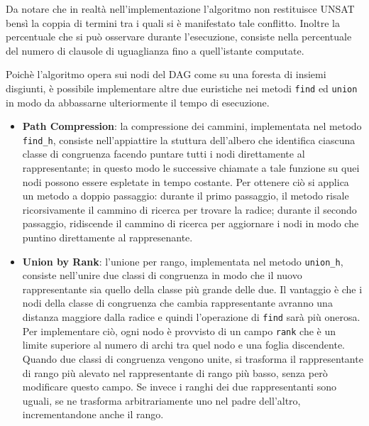 \documentclass[a4paper,11pt]{article}
\begin{document}
Da notare che in realtà nell'implementazione l'algoritmo non restituisce 
UNSAT bensì la coppia di termini tra i quali si è 
manifestato tale conflitto. Inoltre la percentuale che si può osservare 
durante l'esecuzione, consiste nella percentuale del numero di clausole di 
uguaglianza fino a quell'istante computate.\par
Poichè l'algoritmo opera sui nodi del DAG come su una foresta di insiemi 
disgiunti, è possibile implementare altre due euristiche nei metodi 
\texttt{find} ed \texttt{union} in modo da abbassarne ulteriormente 
il tempo di esecuzione.
\begin{itemize}
\item {\bf Path Compression}: la compressione dei cammini, implementata 
nel metodo \texttt{find\_h}, consiste nell'appiattire la stuttura 
dell'albero che identifica ciascuna classe di congruenza facendo puntare
tutti i nodi direttamente al rappresentante; in questo modo le successive 
chiamate a tale funzione su quei nodi possono essere espletate in 
tempo costante. Per ottenere ciò si applica un metodo a doppio 
passaggio: durante il primo passaggio, il metodo risale ricorsivamente 
il cammino di ricerca per trovare la radice; durante il secondo passaggio, 
ridiscende il cammino di ricerca per aggiornare i nodi in modo che 
puntino direttamente al rappresenante.
\item {\bf Union by Rank}: l'unione per rango, implementata nel metodo 
\texttt{union\_h}, consiste nell'unire due classi di congruenza in 
modo che il nuovo rappresentante sia quello della classe più grande 
delle due. Il vantaggio è che i nodi della classe di congruenza che 
cambia rappresentante avranno una distanza maggiore dalla radice e 
quindi l'operazione di \texttt{find} sarà più onerosa. Per implementare 
ciò, ogni nodo è provvisto di un campo \texttt{rank} che è un limite 
superiore al numero di archi tra quel nodo e una foglia discendente.
Quando due classi di congruenza vengono unite, si trasforma il 
rappresentante di rango più alevato nel rappresentante di rango più basso, 
senza però modificare questo campo. Se invece i ranghi dei due 
rappresentanti sono uguali, se ne trasforma arbitrariamente uno nel 
padre dell'altro, incrementandone anche il rango.
\end{itemize}

\end{document}
